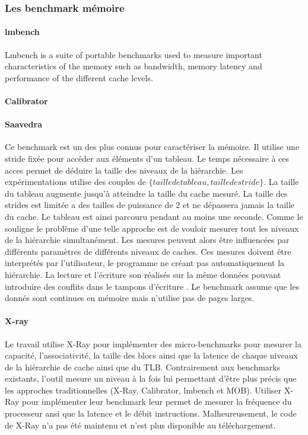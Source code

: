 \subsubsection{Les benchmark mémoire}


\paragraph{lmbench \cite{HPC:lmbench}} Lmbench is a suite of portable benchmarks used to measure important characteristics of the memory such as bandwidth, memory latency and performance of the different cache levels.

\paragraph{Calibrator}


\paragraph{Saavedra} Ce benchmark est un des plus connus pour caractériser la mémoire. Il utilise une stride fixée pour accéder aux éléments d'un tableau. Le temps nécessaire à ces acces permet de déduire la taille des niveaux de la hiérarchie. Les expérimentations utilise des couples de $\{taille de tableau, taille de stride\}$. La taille du tableau augmente jusqu'à atteindre la taille du cache mesuré. La taille des strides est limitée a des tailles de puissance de 2 et ne dépassera jamais la taille du cache. Le tableau est ainsi parcouru pendant au moins une seconde. Comme le souligne \cite{Yotov2005} le problème d'une telle approche est de vouloir mesurer tout les niveaux de la hiérarchie simultanément. Les mesures peuvent alors être influencées par différents paramètres de différents niveaux de caches. Ces mesures doivent être interprétés par l'utilisateur, le programme ne créant pas automatiquement la hiérarchie. La lecture et l'écriture son réalisés sur la même données pouvant introduire des conflits dans le tampons d'écriture  \cite{Yotov2005}. Le benchmark assume que les donnés sont continues en mémoire mais n'utilise pas de pages larges.


\paragraph{X-ray}
Le travail \cite{Yotov2005} utilise X-Ray pour implémenter des micro-benchmarks pour mesurer la capacité, l'associativité, la taille des blocs ainsi que la latence de chaque niveaux de la hiérarchie de cache ainsi que du TLB. Contrairement aux benchmarks existants, l'outil mesure un niveau à la fois lui permettant d'être plus précis que les approches traditionnelles (X-Ray, Calibrator, lmbench et MOB). Utiliser X-Ray pour implémenter leur benchmark leur permet de mesurer la fréquence du processeur ansi que la latence et le débit instructions. Malheureusement, le code de X-Ray n'a pas été maintenu et n'est plus disponible au téléchargement.


